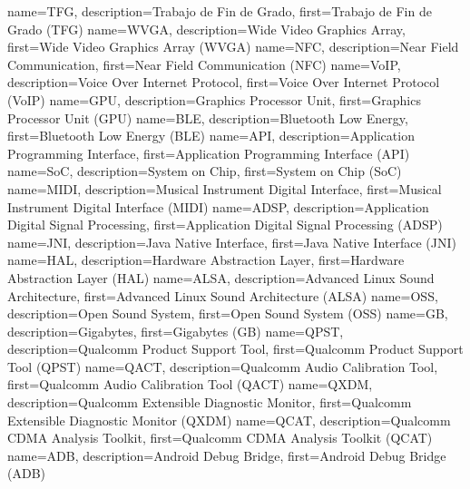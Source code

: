 {
	name={TFG},
	description={Trabajo de Fin de Grado},
	first={Trabajo de Fin de Grado (TFG)}
}
{
  name={WVGA},
  description={Wide Video Graphics Array},
  first={Wide Video Graphics Array (WVGA)}
}
{
	name={NFC},
	description={Near Field Communication},
	first={Near Field Communication (NFC)}
}
{
	name={VoIP},
	description={Voice Over Internet Protocol},
	first={Voice Over Internet Protocol (VoIP)}
}
{
	name={GPU},
	description={Graphics Processor Unit},
	first={Graphics Processor Unit (GPU)}
}
{
	name={BLE},
	description={Bluetooth Low Energy},
	first={Bluetooth Low Energy (BLE)}
}
{
	name={API},
	description={Application Programming Interface},
	first={Application Programming Interface (API)}
}
{
	name={SoC},
	description={System on Chip},
	first={System on Chip (SoC)}
}
{
	name={MIDI},
	description={Musical Instrument Digital Interface},
	first={Musical Instrument Digital Interface (MIDI)}
}
{
	name={ADSP},
	description={Application Digital Signal Processing},
	first={Application Digital Signal Processing (ADSP)}
}
{
	name={JNI},
	description={Java Native Interface},
	first={Java Native Interface (JNI)}
}
{
	name={HAL},
	description={Hardware Abstraction Layer},
	first={Hardware Abstraction Layer (HAL)}
}
{
	name={ALSA},
	description={Advanced Linux Sound Architecture},
	first={Advanced Linux Sound Architecture (ALSA)}
}
{
	name={OSS},
	description={Open Sound System},
	first={Open Sound System (OSS)}
}
{
	name={GB},
	description={Gigabytes},
	first={Gigabytes (GB)}
}
{
	name={QPST},
	description={Qualcomm Product Support Tool},
	first={Qualcomm Product Support Tool (QPST)}
}
{
	name={QACT},
	description={Qualcomm Audio Calibration Tool},
	first={Qualcomm Audio Calibration Tool (QACT)}
}
{
	name={QXDM},
	description={Qualcomm Extensible Diagnostic Monitor},
	first={Qualcomm Extensible Diagnostic Monitor (QXDM)}
}
{
	name={QCAT},
	description={Qualcomm CDMA Analysis Toolkit},
	first={Qualcomm CDMA Analysis Toolkit (QCAT)}
}
{
	name={ADB},
	description={Android Debug Bridge},
	first={Android Debug Bridge (ADB)}
}
